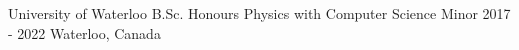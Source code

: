 

\begin{cveducation}

  \cvschool
    {University of Waterloo } %
    {B.Sc. Honours Physics with Computer Science Minor} %
    {} %
    {2017 - 2022} %
    {Waterloo, Canada} %
    
\end{cveducation}
